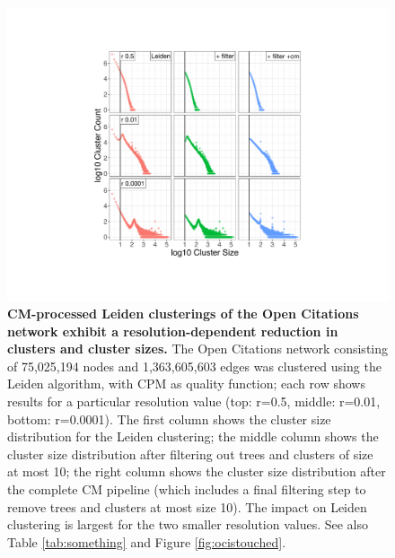 \documentclass[11pt]{article}   	%
\begin{document}
\begin{figure}[H]
\centering
\includegraphics[width=0.8\linewidth]{figs/fig1_kn.pdf}
\caption{\textbf{CM-processed Leiden clusterings of the Open Citations network exhibit a resolution-dependent reduction in clusters and cluster sizes.}
The Open Citations network consisting of 75,025,194 nodes and 1,363,605,603 edges was clustered using the Leiden algorithm,
with CPM as quality function; each row shows results for a particular resolution value (top: r=0.5, middle: r=0.01, bottom: r=0.0001).
The first column shows the cluster size distribution for the Leiden clustering; the middle column shows the cluster size distribution after filtering out trees and clusters of size at most 10; the right column shows the cluster size distribution after the complete CM pipeline (which includes a final filtering step to remove trees and clusters at most size 10).
The impact on Leiden clustering is largest for the two smaller resolution values.
See also   Table \ref{tab:something} and Figure \ref{fig:ocistouched}.}
\label{fig:oc_size_count_plots_leiden}
\end{figure}
\end{document}
